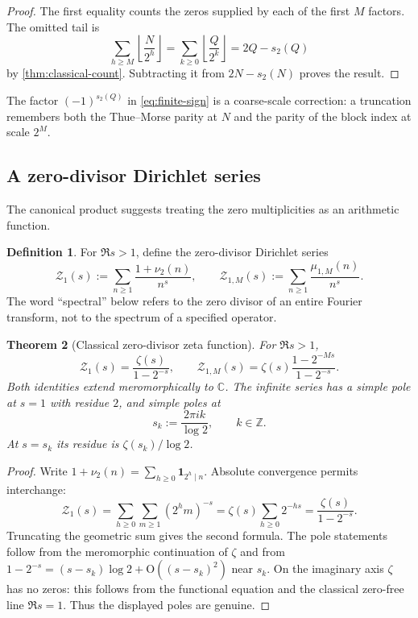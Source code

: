 \documentclass[11pt,a4paper]{article}
\theoremstyle{frontier}
\newtheorem{theorem}{Theorem}[section]
\theoremstyle{definition}
\newtheorem{definition}[theorem]{Definition}
\newcommand{\Z}{\mathbb Z}
\newcommand{\C}{\mathbb C}
\newcommand{\floor}[1]{\left\lfloor #1\right\rfloor}
\newcommand{\bigO}{\mathrm O}
\begin{document}
\begin{proof}
The first equality counts the zeros supplied by each of the first $M$ factors.  The omitted tail is
\[
 \sum_{h\ge M}\floor{\frac N{2^h}}
 =\sum_{k\ge0}\floor{\frac Q{2^k}}
 =2Q-s_2(Q)
\]
by \cref{thm:classical-count}.  Subtracting it from $2N-s_2(N)$ proves the result.
\end{proof}

The factor $(-1)^{s_2(Q)}$ in \eqref{eq:finite-sign} is a coarse-scale correction: a truncation remembers both the Thue--Morse parity at $N$ and the parity of the block index at scale $2^M$.

\subsection{A zero-divisor Dirichlet series}

The canonical product suggests treating the zero multiplicities as an arithmetic function.

\begin{definition}
For $\Re s>1$, define the zero-divisor Dirichlet series
\[
  \mathcal Z_1(s):=\sum_{n\ge1}\frac{1+\nu_2(n)}{n^s},
  \qquad
  \mathcal Z_{1,M}(s):=\sum_{n\ge1}\frac{\mu_{1,M}(n)}{n^s}.
\]
The word ``spectral'' below refers to the zero divisor of an entire Fourier transform, not to the spectrum of a specified operator.
\end{definition}

\begin{theorem}[Classical zero-divisor zeta function]\label{thm:zeta1}
For $\Re s>1$,
\begin{equation}\label{eq:zeta1}
  \mathcal Z_1(s)=\frac{\zeta(s)}{1-2^{-s}},
  \qquad
  \mathcal Z_{1,M}(s)=\zeta(s)\frac{1-2^{-Ms}}{1-2^{-s}}.
\end{equation}
Both identities extend meromorphically to $\C$.  The infinite series has a simple pole at $s=1$ with residue $2$, and simple poles at
\begin{equation}\label{eq:dyadic-lattice}
  s_k:=\frac{2\pi i k}{\log2},\qquad k\in\Z.
\end{equation}
At $s=s_k$ its residue is $\zeta(s_k)/\log2$.
\end{theorem}

\begin{proof}
Write $1+\nu_2(n)=\sum_{h\ge0}\mathbf 1_{2^h\mid n}$.  Absolute convergence permits interchange:
\[
 \mathcal Z_1(s)=\sum_{h\ge0}\sum_{m\ge1}(2^hm)^{-s}
 =\zeta(s)\sum_{h\ge0}2^{-hs}
 =\frac{\zeta(s)}{1-2^{-s}}.
\]
Truncating the geometric sum gives the second formula.  The pole statements follow from the meromorphic continuation of $\zeta$ and from
$1-2^{-s}=(s-s_k)\log2+\bigO((s-s_k)^2)$ near $s_k$.  On the imaginary axis $\zeta$ has no zeros: this follows from the functional equation and the classical zero-free line $\Re s=1$.  Thus the displayed poles are genuine.
\end{proof}
\end{document}

